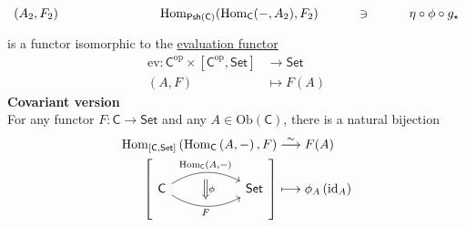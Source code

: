 \documentclass{report}
\begin{document}
{\[\begin{tikzcd}[ampersand replacement=\&]
            (A_2,F_2)  \& \& \& \operatorname{Hom}_{\mathsf{Psh}(\mathsf{C})}(\mathrm{Hom}_{\mathsf{C}}(-,A_2),F_2)\& \ni \& \eta\circ \phi\circ g_\star
        \end{tikzcd}
    \]
    is a functor isomorphic to the \hyperref[th:evaluation_functor]{evaluation functor}
    \begin{align*}
        \mathrm{ev}:\mathsf{C}^{\mathrm{op}}\times \left[\mathsf{C}^{\mathrm{op}},\mathsf{Set}\right]&\longrightarrow \mathsf{Set}\\
        \left(A,F\right)&\longmapsto F(A)
    \end{align*}
    \textbf{Covariant version}\\
    For any functor $F:\mathsf{C}\to \mathsf{Set}$ and any $A\in \mathrm{Ob}(\mathsf{C})$, there is a natural bijection
    \begin{align*}
        \operatorname{Hom}_{\left[\mathsf{C},\mathsf{Set}\right]}\left(\operatorname{Hom}_{\mathsf{C}}\left(A,-\right), F\right) & \overset{\sim}{\longrightarrow} F(A) \\
        {  \left[ \begin{tikzcd}[ampersand replacement=\&]
            \mathsf{C} \arrow[r, "\operatorname{Hom}_{\mathsf{C}}\left(A{,}-\right)"{name=A, above}, bend left] \arrow[r, "F"'{name=B, below}, bend right] \&[+30pt] \mathsf{Set}
            \arrow[Rightarrow, shorten <=5.5pt, shorten >=5.5pt, from=A.south-|B, to=B, "\phi"]
        \end{tikzcd}\right] } & \longmapsto \phi_A\left(\operatorname{id}_A\right)
    \end{align*}
}
\end{document}
